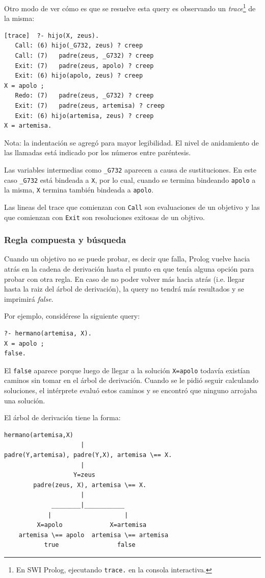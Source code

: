 \documentclass[12pt,titlepage]{article}
\begin{document}
Otro modo de ver cómo es que se resuelve esta query es observando un \emph{trace}\footnote{En SWI Prolog, ejecutando \lstinline|trace.| en la consola interactiva.} de la misma:
\begin{Verbatim}[fontsize=\small]
[trace]  ?- hijo(X, zeus).
   Call: (6) hijo(_G732, zeus) ? creep
   Call: (7)   padre(zeus, _G732) ? creep
   Exit: (7)   padre(zeus, apolo) ? creep
   Exit: (6) hijo(apolo, zeus) ? creep
X = apolo ;
   Redo: (7)   padre(zeus, _G732) ? creep
   Exit: (7)   padre(zeus, artemisa) ? creep
   Exit: (6) hijo(artemisa, zeus) ? creep
X = artemisa.
\end{Verbatim}

Nota: la indentación se agregó para mayor legibilidad. El nivel de anidamiento de las llamadas está indicado por los números entre paréntesis.

Las variables intermedias como \lstinline|_G732| aparecen a causa de sustituciones. En este caso \lstinline|_G732| está bindeada a \lstinline|X|, por lo cual, cuando se termina bindeando \lstinline|apolo| a la misma, \lstinline|X| termina también bindeada a \lstinline|apolo|.

Las lineas del trace que comienzan con \lstinline|Call| son evaluaciones de un objetivo y las que comienzan con \lstinline|Exit| son resoluciones exitosas de un objtivo.

\subsubsection{Regla compuesta y búsqueda}

Cuando un objetivo no se puede probar, es decir que falla, Prolog vuelve hacia atrás en la cadena de derivación hasta el punto en que tenía alguna opción para probar con otra regla. En caso de no poder volver más hacia atrás (i.e. llegar hasta la raiz del árbol de derivación), la query no tendrá más resultados y se imprimirá \emph{false}.

Por ejemplo, considérese la siguiente query:
\begin{lstlisting}
?- hermano(artemisa, X).
X = apolo ;
false.
\end{lstlisting}

El \lstinline|false| aparece porque luego de llegar a la solución \lstinline|X=apolo| todavía existían caminos sin tomar en el árbol de derivación. Cuando se le pidió seguir calculando soluciones, el intérprete evaluó estos caminos y se encontró que ninguno arrojaba una solución.

El árbol de derivación tiene la forma:
\begin{Verbatim}[samepage=true,fontsize=\small]
            hermano(artemisa,X)
                     |
padre(Y,artemisa), padre(Y,X), artemisa \== X.
                     |
                   Y=zeus
        padre(zeus, X), artemisa \== X.
                     |             
             ________|___________
            |                    |
         X=apolo             X=artemisa
    artemisa \== apolo  artemisa \== artemisa
           true                false
\end{Verbatim}
\end{document}
